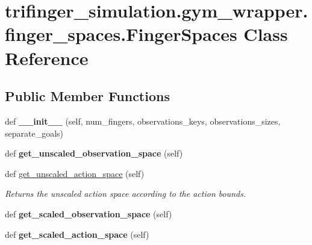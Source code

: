 \hypertarget{classtrifinger__simulation_1_1gym__wrapper_1_1finger__spaces_1_1FingerSpaces}{}\section{trifinger\+\_\+simulation.\+gym\+\_\+wrapper.\+finger\+\_\+spaces.\+Finger\+Spaces Class Reference}
\label{classtrifinger__simulation_1_1gym__wrapper_1_1finger__spaces_1_1FingerSpaces}
\subsection*{Public Member Functions}
\begin{DoxyCompactItemize}
\item 
\mbox{\label{classtrifinger__simulation_1_1gym__wrapper_1_1finger__spaces_1_1FingerSpaces_a7193543098a4655e7d5a63c133d0d399}} 
def {\bfseries \+\_\+\+\_\+init\+\_\+\+\_\+} (self, num\+\_\+fingers, observations\+\_\+keys, observations\+\_\+sizes, separate\+\_\+goals)
\item 
\mbox{\label{classtrifinger__simulation_1_1gym__wrapper_1_1finger__spaces_1_1FingerSpaces_a71bba5fe8e1228d14d5394745d173e09}} 
def {\bfseries get\+\_\+unscaled\+\_\+observation\+\_\+space} (self)
\item 
\mbox{\label{classtrifinger__simulation_1_1gym__wrapper_1_1finger__spaces_1_1FingerSpaces_a839d244f6a939aff8c2f1fb2ed2a33df}} 
def \hyperlink{classtrifinger__simulation_1_1gym__wrapper_1_1finger__spaces_1_1FingerSpaces_a839d244f6a939aff8c2f1fb2ed2a33df}{get\+\_\+unscaled\+\_\+action\+\_\+space} (self)
\begin{DoxyCompactList}\small\item\em Returns the unscaled action space according to the action bounds. \end{DoxyCompactList}\item 
\mbox{\label{classtrifinger__simulation_1_1gym__wrapper_1_1finger__spaces_1_1FingerSpaces_a3a2f00342767679322d45091cb4eecdf}} 
def {\bfseries get\+\_\+scaled\+\_\+observation\+\_\+space} (self)
\item 
\mbox{\label{classtrifinger__simulation_1_1gym__wrapper_1_1finger__spaces_1_1FingerSpaces_ab0379b8f1ffc1951be8f6ac870b6f31e}} 
def {\bfseries get\+\_\+scaled\+\_\+action\+\_\+space} (self)
\end{DoxyCompactItemize}

